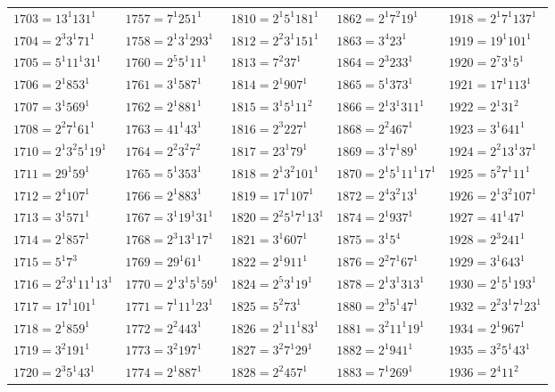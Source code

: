 {\begin{longtable}[c]{*{5}{l}}
$1703=13^{1}131^{1}$&$1757=7^{1}251^{1}$&$1810=2^{1}5^{1}181^{1}$&$1862=2^{1}7^{2}19^{1}$&$1918=2^{1}7^{1}137^{1}$\\
$1704=2^{3}3^{1}71^{1}$&$1758=2^{1}3^{1}293^{1}$&$1812=2^{2}3^{1}151^{1}$&$1863=3^{4}23^{1}$&$1919=19^{1}101^{1}$\\
$1705=5^{1}11^{1}31^{1}$&$1760=2^{5}5^{1}11^{1}$&$1813=7^{2}37^{1}$&$1864=2^{3}233^{1}$&$1920=2^{7}3^{1}5^{1}$\\
$1706=2^{1}853^{1}$&$1761=3^{1}587^{1}$&$1814=2^{1}907^{1}$&$1865=5^{1}373^{1}$&$1921=17^{1}113^{1}$\\
$1707=3^{1}569^{1}$&$1762=2^{1}881^{1}$&$1815=3^{1}5^{1}11^{2}$&$1866=2^{1}3^{1}311^{1}$&$1922=2^{1}31^{2}$\\
$1708=2^{2}7^{1}61^{1}$&$1763=41^{1}43^{1}$&$1816=2^{3}227^{1}$&$1868=2^{2}467^{1}$&$1923=3^{1}641^{1}$\\
$1710=2^{1}3^{2}5^{1}19^{1}$&$1764=2^{2}3^{2}7^{2}$&$1817=23^{1}79^{1}$&$1869=3^{1}7^{1}89^{1}$&$1924=2^{2}13^{1}37^{1}$\\
$1711=29^{1}59^{1}$&$1765=5^{1}353^{1}$&$1818=2^{1}3^{2}101^{1}$&$1870=2^{1}5^{1}11^{1}17^{1}$&$1925=5^{2}7^{1}11^{1}$\\
$1712=2^{4}107^{1}$&$1766=2^{1}883^{1}$&$1819=17^{1}107^{1}$&$1872=2^{4}3^{2}13^{1}$&$1926=2^{1}3^{2}107^{1}$\\
$1713=3^{1}571^{1}$&$1767=3^{1}19^{1}31^{1}$&$1820=2^{2}5^{1}7^{1}13^{1}$&$1874=2^{1}937^{1}$&$1927=41^{1}47^{1}$\\
$1714=2^{1}857^{1}$&$1768=2^{3}13^{1}17^{1}$&$1821=3^{1}607^{1}$&$1875=3^{1}5^{4}$&$1928=2^{3}241^{1}$\\
$1715=5^{1}7^{3}$&$1769=29^{1}61^{1}$&$1822=2^{1}911^{1}$&$1876=2^{2}7^{1}67^{1}$&$1929=3^{1}643^{1}$\\
$1716=2^{2}3^{1}11^{1}13^{1}$&$1770=2^{1}3^{1}5^{1}59^{1}$&$1824=2^{5}3^{1}19^{1}$&$1878=2^{1}3^{1}313^{1}$&$1930=2^{1}5^{1}193^{1}$\\
$1717=17^{1}101^{1}$&$1771=7^{1}11^{1}23^{1}$&$1825=5^{2}73^{1}$&$1880=2^{3}5^{1}47^{1}$&$1932=2^{2}3^{1}7^{1}23^{1}$\\
$1718=2^{1}859^{1}$&$1772=2^{2}443^{1}$&$1826=2^{1}11^{1}83^{1}$&$1881=3^{2}11^{1}19^{1}$&$1934=2^{1}967^{1}$\\
$1719=3^{2}191^{1}$&$1773=3^{2}197^{1}$&$1827=3^{2}7^{1}29^{1}$&$1882=2^{1}941^{1}$&$1935=3^{2}5^{1}43^{1}$\\
$1720=2^{3}5^{1}43^{1}$&$1774=2^{1}887^{1}$&$1828=2^{2}457^{1}$&$1883=7^{1}269^{1}$&$1936=2^{4}11^{2}$\\

\end{longtable}}
